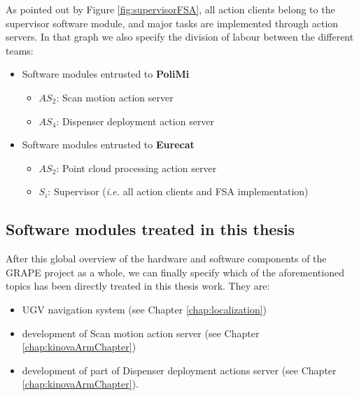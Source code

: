 

As pointed out by Figure \ref{fig:supervisorFSA}, all action clients belong to the supervisor software module, and major tasks are implemented through action servers. In that graph we also specify the division of labour between the different teams:

\begin{itemize}
	\item Software modules entrusted to \textbf{PoliMi}
		\begin{itemize}
			\item $AS_2$: Scan motion action server
			\item $AS_4$:	 Dispenser deployment action server
		\end{itemize}
	\item Software modules entrusted to \textbf{Eurecat}
		\begin{itemize}
			\item $AS_2$: Point cloud processing action server
			\item $S_i$:	 Supervisor (\textit{i.e.} all action clients and \ac{FSA} implementation)
		\end{itemize}		
\end{itemize}

\subsection{Software modules treated in this thesis}

After this global overview of the hardware and software components of the \ac{GRAPE} project as a whole, we can finally specify which of the aforementioned topics has been directly treated in this thesis work. They are:
\begin{itemize}
	\item \ac{UGV} navigation system (see Chapter \ref{chap:localization})
	\item development of Scan motion action server (see Chapter \ref{chap:kinovaArmChapter})
	\item development of part of Dispenser deployment actions server (see Chapter \ref{chap:kinovaArmChapter}).
\end{itemize}
